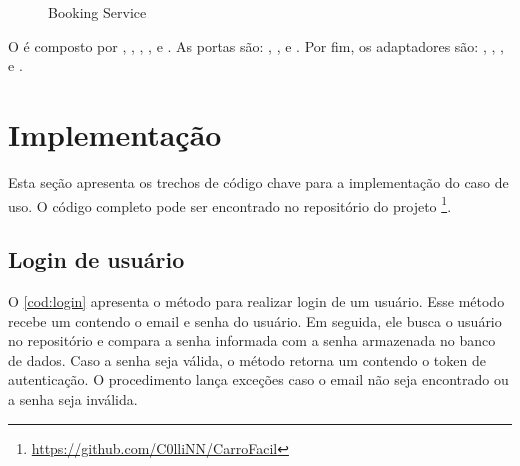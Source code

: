 \begin{figure}[H]
    \centering
    \caption{Booking Service}
    \label{fig:booking-service}
\end{figure}

O  é composto por , , , ,  e . As portas são: , ,  e . Por fim, os adaptadores são: , , ,  e .

\section{Implementação}
Esta seção apresenta os trechos de código chave para a implementação do caso de uso. O código completo pode ser encontrado no repositório do projeto \footnote{\url{https://github.com/C0lliNN/CarroFacil}}.

\subsection{Login de usuário}
O \autoref{cod:login} apresenta o método para realizar login de um usuário. Esse método recebe um  contendo o email e senha do usuário. Em seguida, ele busca o usuário no repositório e compara a senha informada com a senha armazenada no banco de dados. Caso a senha seja válida, o método retorna um  contendo o token de autenticação. O procedimento lança exceções caso o email não seja encontrado ou a senha seja inválida.


